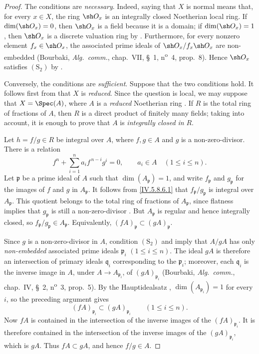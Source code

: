 \begin{proof}
The conditions are \emph{necessary}.  Indeed, saying that $X$ is normal
means that, for every $x\in X$, the ring $\sh O_x$ is an integrally
closed Noetherian local ring.  If $\dim(\sh O_x)=0$, then $\sh O_x$
is a field because it is a domain; if $\dim(\sh O_x)=1$, then
$\sh O_x$ is a discrete valuation ring by .
Furthermore, for every nonzero element $f_x\in\sh O_x$, the associated
prime ideals of $\sh O_x/f_x\sh O_x$ are non-embedded
(Bourbaki, \emph{Alg.\ comm.}, chap.~VII, \S~1, n\textsuperscript{o}~4, prop.~8).
Hence $\sh O_x$ satisfies $(\mathrm S_2)$ by .

Conversely, the conditions are \emph{sufficient}.  Suppose that the two conditions hold.  It follows first
from  that $X$ is \emph{reduced}.  Since the question is
local, we may suppose that $X=\Spec(A)$, where $A$ is a \emph{reduced}
Noetherian ring .  If $R$ is the total ring of
fractions of $A$, then $R$ is a direct product of finitely many
fields; taking  into account, it is enough to prove
that $A$ is \emph{integrally closed in} $R$.

Let $h=f/g\in R$ be integral over $A$, where $f,g\in A$ and $g$ is a
non-zero-divisor.  There is a relation
\begin{equation}
\label{IV.5.8.6.1}
  f^n+\sum_{i=1}^{n}a_i f^{\,n-i}g^i=0,
  \qquad a_i\in A\quad(1\leq i\leq n).
\tag{5.8.6.1}
\end{equation}
Let $\mathfrak p$ be a prime ideal of $A$ such that
$\dim(A_{\mathfrak p})=1$, and write $f_{\mathfrak p}$ and
$g_{\mathfrak p}$ for the images of $f$ and $g$ in
$A_{\mathfrak p}$.  It follows from \eqref{IV.5.8.6.1} that
$f_{\mathfrak p}/g_{\mathfrak p}$ is integral over
$A_{\mathfrak p}$.  This quotient belongs to the total ring of
fractions of $A_{\mathfrak p}$, since flatness implies that
$g_{\mathfrak p}$ is still a non-zero-divisor
.  But $A_{\mathfrak p}$ is regular and hence
integrally closed, so
$f_{\mathfrak p}/g_{\mathfrak p}\in A_{\mathfrak p}$.  Equivalently, $(fA)_{\mathfrak p}\subset (gA)_{\mathfrak p}$.

Since $g$ is a non-zero-divisor in $A$, condition $(\mathrm S_2)$
and  imply that $A/gA$ has only \emph{non-embedded}
associated prime ideals $\mathfrak p_i$ $(1\leq i\leq n)$.  The ideal
$gA$ is therefore an intersection of primary ideals
$\mathfrak q_i$ corresponding to the $\mathfrak p_i$; moreover, each
$\mathfrak q_i$ is the inverse image in $A$, under
$A\to A_{\mathfrak p_i}$, of $(gA)_{\mathfrak p_i}$
(Bourbaki, \emph{Alg.\ comm.}, chap.~IV, \S~2, n\textsuperscript{o}~3, prop.~5).
By the Hauptidealsatz ,
$\dim(A_{\mathfrak p_i})=1$ for every $i$, so the preceding argument
gives
\[
  (fA)_{\mathfrak p_i}\subset(gA)_{\mathfrak p_i}
  \qquad(1\leq i\leq n).
\]
Now $fA$ is contained in the intersection of the inverse images of
the $(fA)_{\mathfrak p_i}$.  It is therefore contained in the
intersection of the inverse images of the $(gA)_{\mathfrak p_i}$,
which is $gA$.  Thus $fA\subset gA$, and hence $f/g\in A$.
\end{proof}

